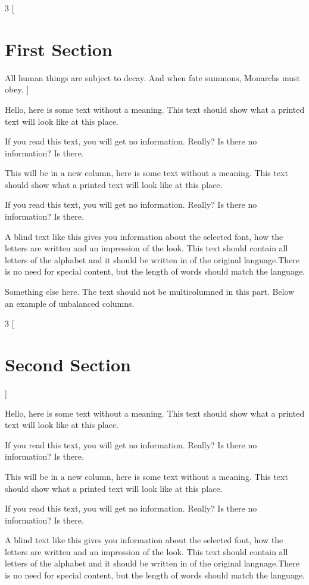 \documentclass{article}
\begin{document}
\begin{multicols}{3}
[
\section{First Section}
All human things are subject to decay. And when fate summons, Monarchs must obey.
]

Hello, here is some text without a meaning.  This text should show what 
a printed text will look like at this place.

If you read this text, you will get no information.  Really?  Is there 
no information?  Is there.

\columnbreak %

This will be in a new column, here is some text without a meaning.  This text should show what 
a printed text will look like at this place.

If you read this text, you will get no information.  Really?  Is there 
no information?  Is there.

A blind text like this gives you information about the selected font, how 
the letters are written and an impression of the look.  This text should
contain all letters of the alphabet and it should be written in of the
original language.There is no need for special content, but the length of
words should match the language.
\end{multicols}

Something else here. The text should not be multicolumned in this part. Below an example of unbalanced columns.

\begin{multicols*}{3}
[
\section{Second Section}
]

Hello, here is some text without a meaning.  This text should show what 
a printed text will look like at this place.

If you read this text, you will get no information.  Really?  Is there 
no information?  Is there.

This will be in a new column, here is some text without a meaning.  This text should show what 
a printed text will look like at this place.

If you read this text, you will get no information.  Really?  Is there 
no information?  Is there.

A blind text like this gives you information about the selected font, how 
the letters are written and an impression of the look.  This text should
contain all letters of the alphabet and it should be written in of the
original language.There is no need for special content, but the length of
words should match the language.
\end{multicols*}
\end{document}
